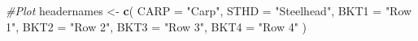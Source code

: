 \documentclass[
]{article}
\newenvironment{Shaded}{\begin{snugshade}}{\end{snugshade}}
\newcommand{\AttributeTok}[1]{\textcolor[rgb]{0.13,0.29,0.53}{#1}}
\newcommand{\CommentTok}[1]{\textcolor[rgb]{0.56,0.35,0.01}{\textit{#1}}}
\newcommand{\FunctionTok}[1]{\textcolor[rgb]{0.13,0.29,0.53}{\textbf{#1}}}
\newcommand{\NormalTok}[1]{#1}
\newcommand{\OtherTok}[1]{\textcolor[rgb]{0.56,0.35,0.01}{#1}}
\newcommand{\StringTok}[1]{\textcolor[rgb]{0.31,0.60,0.02}{#1}}
\begin{document}
\begin{Shaded}
\begin{Highlighting}[]
\CommentTok{\#Plot}
\NormalTok{headernames }\OtherTok{\textless{}{-}} \FunctionTok{c}\NormalTok{(}
  \StringTok{\textasciigrave{}}\AttributeTok{CARP}\StringTok{\textasciigrave{}} \OtherTok{=} \StringTok{"Carp"}\NormalTok{,}
  \StringTok{\textasciigrave{}}\AttributeTok{STHD}\StringTok{\textasciigrave{}} \OtherTok{=} \StringTok{"Steelhead"}\NormalTok{,}
  \StringTok{\textasciigrave{}}\AttributeTok{BKT1}\StringTok{\textasciigrave{}} \OtherTok{=} \StringTok{"Row 1"}\NormalTok{,}
  \StringTok{\textasciigrave{}}\AttributeTok{BKT2}\StringTok{\textasciigrave{}} \OtherTok{=} \StringTok{"Row 2"}\NormalTok{,}
  \StringTok{\textasciigrave{}}\AttributeTok{BKT3}\StringTok{\textasciigrave{}} \OtherTok{=} \StringTok{"Row 3"}\NormalTok{,}
  \StringTok{\textasciigrave{}}\AttributeTok{BKT4}\StringTok{\textasciigrave{}} \OtherTok{=} \StringTok{"Row 4"}
\NormalTok{)}


\end{Highlighting}
\end{Shaded}
\end{document}
